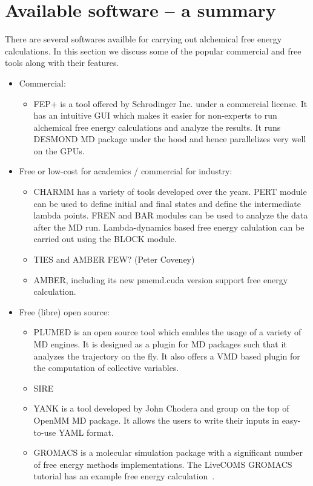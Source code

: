 \documentclass[9pt,bestpractices]{livecoms}
\begin{document}
\section{Available software -- a summary}
\label{sec:software}
There are several softwares availble for carrying out alchemical free energy calculations. In this section we discuss some of the popular commercial and free tools along with their features. 
\begin{itemize}
\item Commercial:
   \begin{itemize}
    \item FEP+ is a tool offered by Schrodinger Inc. under a commercial license. It has an intuitive GUI which makes it easier for non-experts to run alchemical free energy calculations and analyze the results. It runs DESMOND MD package under the hood and hence parallelizes very well on the GPUs. 
    \end{itemize}
\item Free or low-cost for academics / commercial for industry:
	\begin{itemize}
	\item CHARMM has a variety of tools developed over the years. PERT module can be used to define initial and final states and define the intermediate lambda points. FREN and BAR modules can be used to analyze the data after the MD run. Lambda-dynamics based free energy calulation can be carried out using the BLOCK module.  
	\item TIES and AMBER FEW? (Peter Coveney)
	\item AMBER, including its new pmemd.cuda version support free energy calculation. 
	\end{itemize}
\item Free (libre) open source:
	\begin{itemize}
	\item PLUMED is an open source tool which enables the usage of a variety of MD engines. It is designed as a plugin for MD packages such that it analyzes the trajectory on the fly. It also offers a VMD based plugin for the computation of collective variables.   	
	\item SIRE
	\item YANK is a tool developed by John Chodera and group on the top of OpenMM MD package. It allows the users to write their inputs in easy-to-use YAML format.
	\item GROMACS is a molecular simulation package with a significant number of free energy methods implementations. The LiveCOMS GROMACS tutorial has an example free energy calculation~\cite{LiveCOMS-gromacs}.

\end{itemize}
\end{itemize}
\end{document}
